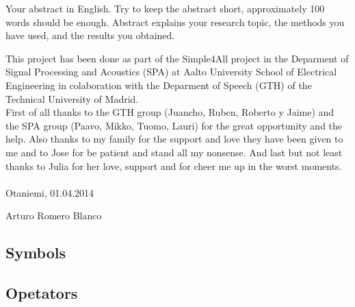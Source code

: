 \documentclass[english,12pt,a4paper,pdftex]{article}
\begin{document}
\makecoverpage

\newpage
%
\begin{abstractpage}[english]
 Your abstract in English. Try to keep the abstract short, approximately 
 100 words should be enough. Abstract explains your research topic, 
 the methods you have used, and the results you obtained.  
\end{abstractpage}
%
This project has been done as part of the Simple4All project in the Deparment of Signal Processing and Acoustics (SPA)  at Aalto University School of Electrical Engineering in colaboration with the Deparment of Speech (GTH) of the Technical University of Madrid.\\
First of all thanks to the GTH group (Juancho, Ruben, Roberto y Jaime) and the SPA group (Paavo, Mikko, Tuomo, Lauri) for the great opportunity and the help.
Also thanks to my family for the support and love they have been given to me and to Jose for be patient and stand all my nonsense.
And last but not least thanks to Julia for her love, support and for cheer me up in the worst moments.\\\\
\vspace{5cm}
Otaniemi, 01.04.2014

\vspace{5mm}
{\hfill Arturo Romero Blanco \hspace{1cm}}

\newpage

\thesistableofcontents
\newpage
\listoffigures
\listoftables
\subsection*{Symbols}

\subsection*{Opetators}
\end{document}
